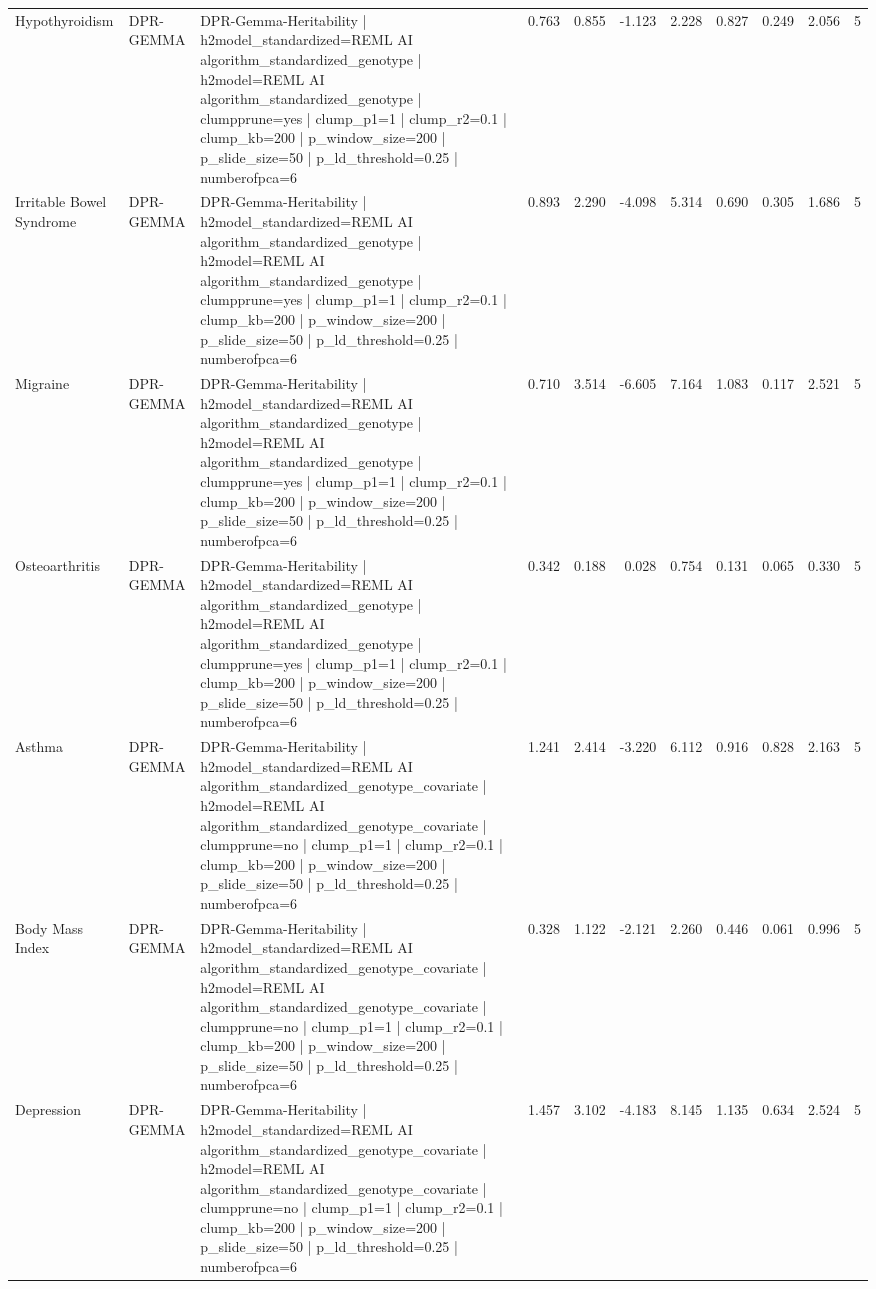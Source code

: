 \begin{landscape}
\begin{longtable}{p{2.4cm}p{1.8cm}p{6.0cm}rrrrrrrr}
Hypothyroidism & DPR-GEMMA & DPR-Gemma-Heritability | h2model\_standardized=REML AI algorithm\_standardized\_genotype | h2model=REML AI algorithm\_standardized\_genotype | clumpprune=yes | clump\_p1=1 | clump\_r2=0.1 | clump\_kb=200 | p\_window\_size=200 | p\_slide\_size=50 | p\_ld\_threshold=0.25 | numberofpca=6 & 0.763 & 0.855 & -1.123 & 2.228 & 0.827 & 0.249 & 2.056 & 5 \\
Irritable Bowel Syndrome & DPR-GEMMA & DPR-Gemma-Heritability | h2model\_standardized=REML AI algorithm\_standardized\_genotype | h2model=REML AI algorithm\_standardized\_genotype | clumpprune=yes | clump\_p1=1 | clump\_r2=0.1 | clump\_kb=200 | p\_window\_size=200 | p\_slide\_size=50 | p\_ld\_threshold=0.25 | numberofpca=6 & 0.893 & 2.290 & -4.098 & 5.314 & 0.690 & 0.305 & 1.686 & 5 \\
Migraine & DPR-GEMMA & DPR-Gemma-Heritability | h2model\_standardized=REML AI algorithm\_standardized\_genotype | h2model=REML AI algorithm\_standardized\_genotype | clumpprune=yes | clump\_p1=1 | clump\_r2=0.1 | clump\_kb=200 | p\_window\_size=200 | p\_slide\_size=50 | p\_ld\_threshold=0.25 | numberofpca=6 & 0.710 & 3.514 & -6.605 & 7.164 & 1.083 & 0.117 & 2.521 & 5 \\
Osteoarthritis & DPR-GEMMA & DPR-Gemma-Heritability | h2model\_standardized=REML AI algorithm\_standardized\_genotype | h2model=REML AI algorithm\_standardized\_genotype | clumpprune=yes | clump\_p1=1 | clump\_r2=0.1 | clump\_kb=200 | p\_window\_size=200 | p\_slide\_size=50 | p\_ld\_threshold=0.25 | numberofpca=6 & 0.342 & 0.188 & 0.028 & 0.754 & 0.131 & 0.065 & 0.330 & 5 \\
Asthma & DPR-GEMMA & DPR-Gemma-Heritability | h2model\_standardized=REML AI algorithm\_standardized\_genotype\_covariate | h2model=REML AI algorithm\_standardized\_genotype\_covariate | clumpprune=no | clump\_p1=1 | clump\_r2=0.1 | clump\_kb=200 | p\_window\_size=200 | p\_slide\_size=50 | p\_ld\_threshold=0.25 | numberofpca=6 & 1.241 & 2.414 & -3.220 & 6.112 & 0.916 & 0.828 & 2.163 & 5 \\
Body Mass Index & DPR-GEMMA & DPR-Gemma-Heritability | h2model\_standardized=REML AI algorithm\_standardized\_genotype\_covariate | h2model=REML AI algorithm\_standardized\_genotype\_covariate | clumpprune=no | clump\_p1=1 | clump\_r2=0.1 | clump\_kb=200 | p\_window\_size=200 | p\_slide\_size=50 | p\_ld\_threshold=0.25 | numberofpca=6 & 0.328 & 1.122 & -2.121 & 2.260 & 0.446 & 0.061 & 0.996 & 5 \\
Depression & DPR-GEMMA & DPR-Gemma-Heritability | h2model\_standardized=REML AI algorithm\_standardized\_genotype\_covariate | h2model=REML AI algorithm\_standardized\_genotype\_covariate | clumpprune=no | clump\_p1=1 | clump\_r2=0.1 | clump\_kb=200 | p\_window\_size=200 | p\_slide\_size=50 | p\_ld\_threshold=0.25 | numberofpca=6 & 1.457 & 3.102 & -4.183 & 8.145 & 1.135 & 0.634 & 2.524 & 5 \\

\end{longtable}
\end{landscape}
